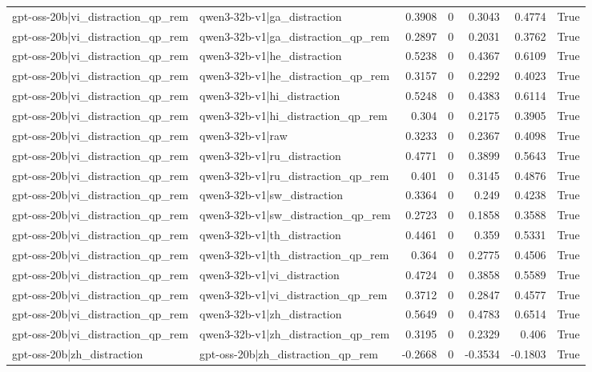 \begin{table}
\begin{tabular}{l l r r r r l}
gpt-oss-20b|vi_distraction_qp_rem & qwen3-32b-v1|ga_distraction & 0.3908 & 0 & 0.3043 & 0.4774 & True \\
gpt-oss-20b|vi_distraction_qp_rem & qwen3-32b-v1|ga_distraction_qp_rem & 0.2897 & 0 & 0.2031 & 0.3762 & True \\
gpt-oss-20b|vi_distraction_qp_rem & qwen3-32b-v1|he_distraction & 0.5238 & 0 & 0.4367 & 0.6109 & True \\
gpt-oss-20b|vi_distraction_qp_rem & qwen3-32b-v1|he_distraction_qp_rem & 0.3157 & 0 & 0.2292 & 0.4023 & True \\
gpt-oss-20b|vi_distraction_qp_rem & qwen3-32b-v1|hi_distraction & 0.5248 & 0 & 0.4383 & 0.6114 & True \\
gpt-oss-20b|vi_distraction_qp_rem & qwen3-32b-v1|hi_distraction_qp_rem & 0.304 & 0 & 0.2175 & 0.3905 & True \\
gpt-oss-20b|vi_distraction_qp_rem & qwen3-32b-v1|raw & 0.3233 & 0 & 0.2367 & 0.4098 & True \\
gpt-oss-20b|vi_distraction_qp_rem & qwen3-32b-v1|ru_distraction & 0.4771 & 0 & 0.3899 & 0.5643 & True \\
gpt-oss-20b|vi_distraction_qp_rem & qwen3-32b-v1|ru_distraction_qp_rem & 0.401 & 0 & 0.3145 & 0.4876 & True \\
gpt-oss-20b|vi_distraction_qp_rem & qwen3-32b-v1|sw_distraction & 0.3364 & 0 & 0.249 & 0.4238 & True \\
gpt-oss-20b|vi_distraction_qp_rem & qwen3-32b-v1|sw_distraction_qp_rem & 0.2723 & 0 & 0.1858 & 0.3588 & True \\
gpt-oss-20b|vi_distraction_qp_rem & qwen3-32b-v1|th_distraction & 0.4461 & 0 & 0.359 & 0.5331 & True \\
gpt-oss-20b|vi_distraction_qp_rem & qwen3-32b-v1|th_distraction_qp_rem & 0.364 & 0 & 0.2775 & 0.4506 & True \\
gpt-oss-20b|vi_distraction_qp_rem & qwen3-32b-v1|vi_distraction & 0.4724 & 0 & 0.3858 & 0.5589 & True \\
gpt-oss-20b|vi_distraction_qp_rem & qwen3-32b-v1|vi_distraction_qp_rem & 0.3712 & 0 & 0.2847 & 0.4577 & True \\
gpt-oss-20b|vi_distraction_qp_rem & qwen3-32b-v1|zh_distraction & 0.5649 & 0 & 0.4783 & 0.6514 & True \\
gpt-oss-20b|vi_distraction_qp_rem & qwen3-32b-v1|zh_distraction_qp_rem & 0.3195 & 0 & 0.2329 & 0.406 & True \\
gpt-oss-20b|zh_distraction & gpt-oss-20b|zh_distraction_qp_rem & -0.2668 & 0 & -0.3534 & -0.1803 & True \\

\end{tabular}
\end{table}
